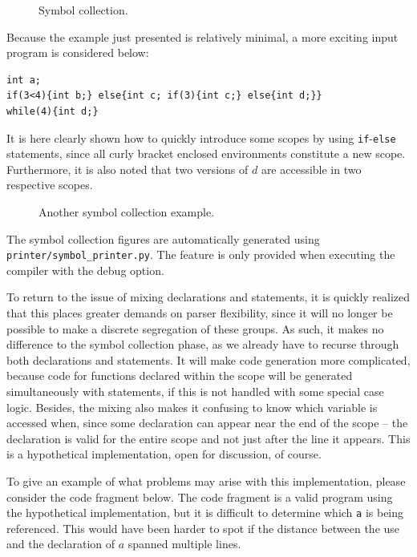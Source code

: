 \begin{figure}[H]
    \centering
    
    \caption{Symbol collection.} 
    \label{fig:symbol_collection}
\end{figure}

Because the example just presented is relatively minimal, a more exciting input program is considered below:

\begin{verbatim}
int a; 
if(3<4){int b;} else{int c; if(3){int c;} else{int d;}} 
while(4){int d;}
\end{verbatim}

It is here clearly shown how to quickly introduce some scopes by using \texttt{if}-\texttt{else} statements, since all curly bracket enclosed environments constitute a new scope. Furthermore, it is also noted that two versions of $d$ are accessible in two respective scopes. 

\begin{figure}[H]
    \centering
    
    \caption{Another symbol collection example.} 
\end{figure}

The symbol collection figures are automatically generated using \texttt{printer/\-symbol\_printer.py}. The feature is only provided when executing the compiler with the debug option.

To return to the issue of mixing declarations and statements, it is quickly realized that this places greater demands on parser flexibility, since it will no longer be possible to make a discrete segregation of these groups. As such, it makes no difference to the symbol collection phase, as we already have to recurse through both declarations and statements. It will make code generation more complicated, because code for functions declared within the scope will be generated simultaneously with statements, if this is not handled with some special case logic. Besides, the mixing also makes it confusing to know which variable is accessed when, since some declaration can appear near the end of the scope -- the declaration is valid for the entire scope and not just after the line it appears. This is a hypothetical implementation, open for discussion, of course.

To give an example of what problems may arise with this implementation, please consider the code fragment below. The code fragment is a valid program using the hypothetical implementation, but it is difficult to determine which \texttt{a} is being referenced. This would have been harder to spot if the distance between the use and the declaration of $a$ spanned multiple lines.

